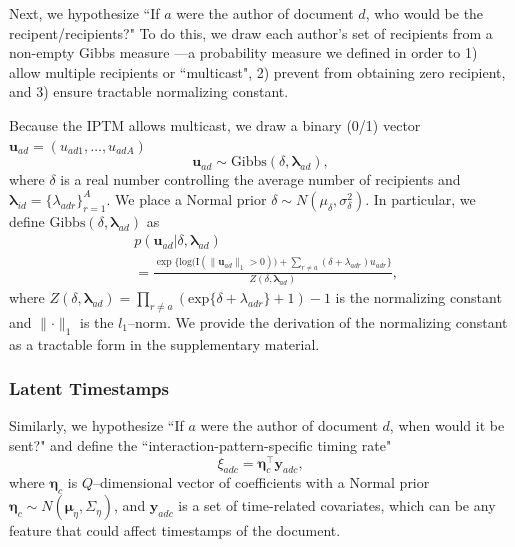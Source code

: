 \documentclass{article}
\begin{document}
Next, we hypothesize ``If $a$ were the
author of document $d$, who would be the recipent/recipients?" To do this, we draw each author's set of recipients from a non-empty Gibbs measure \cite{fellows2017removing}---a probability measure we defined in order to 1) allow multiple recipients or ``multicast", 2) prevent from obtaining zero recipient, and 3) ensure tractable normalizing constant. 

Because the IPTM allows multicast, we draw a binary (0/1) vector $\boldsymbol{u}_{ad}= (u_{ad1},
\ldots, u_{adA})$
\begin{equation} \boldsymbol{u}_{ad}  \sim
\mbox{Gibbs}(\delta, \boldsymbol{\lambda}_{ad}),
\end{equation}
where $\delta$ is a real number controlling the average number of recipients and $\boldsymbol{\lambda}_{id}= \{\lambda_{adr}\}_{r=1}^A$. We place a Normal prior $\delta \sim N(\mu_\delta,\sigma^2_\delta)$. In particular, we define $\mbox{Gibbs}(\delta, \boldsymbol{\lambda}_{ad})$ as
\begin{equation}
\begin{aligned}
&p(\boldsymbol{u}_{ad}|\delta, \boldsymbol{\lambda}_{ad}) \\&= \frac{\exp\Big\{\mbox{log}\big(\text{I}( \lVert \boldsymbol{u}_{ad}\rVert_1 > 0 )\big) + \sum_{r\neq a} (\delta+\lambda_{adr})u_{adr}\Big\}}{Z(\delta,\boldsymbol{\lambda}_{ad})} ,
\end{aligned}
\label{eqn:Gibbs}
\end{equation}
where $Z(\delta,\boldsymbol{\lambda}_{ad})= \prod_{r \neq a} (\mbox{exp}\{\delta+\lambda_{adr}\} + 1)-1$ is the normalizing constant and $\lVert \cdot \rVert_1$ is the $l_1$--norm. We provide the derivation of the normalizing constant as a tractable form in the supplementary material. 

\subsubsection{Latent Timestamps}\label{subsubsec:Hypothetical Timestamps}
Similarly, we hypothesize ``If $a$ were the author of document $d$, when would it be sent?" and define the ``interaction-pattern-specific timing rate"
\begin{equation}
\xi_{adc} = \boldsymbol{\eta}_c^\top \boldsymbol{y}_{adc},
\end{equation}
where $\boldsymbol{\eta}_c$ is $Q$--dimensional vector of coefficients with a Normal prior $\boldsymbol{\eta}_c \sim N(\boldsymbol{\mu}_\eta,\Sigma_\eta)$, and $\boldsymbol{y}_{adc}$ is a set of time-related covariates, which can be any feature that could affect timestamps of the document. 
\end{document}
